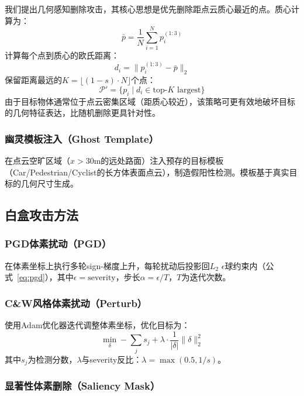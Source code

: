 ﻿\documentclass[12pt,a4paper]{ctexart}
\begin{document}
我们提出几何感知删除攻击，其核心思想是优先删除距点云质心最近的点。质心计算为：
\begin{equation}
  \bar{p} = \frac{1}{N}\sum_{i=1}^{N} p_i^{(1:3)}
  \label{eq:centroid}
\end{equation}
计算每个点到质心的欧氏距离：
\begin{equation}
  d_i = \|p_i^{(1:3)} - \bar{p}\|_2
  \label{eq:dist}
\end{equation}
保留距离最远的$K = \lfloor(1-s)\cdot N\rfloor$个点：
\begin{equation}
  \mathcal{P}' = \{p_i \mid d_i \in \text{top-}K \text{ largest}\}
  \label{eq:geodrop}
\end{equation}
由于目标物体通常位于点云密集区域（距质心较近），该策略可更有效地破坏目标的几何特征表达，比随机删除更具针对性。

\subsubsection{幽灵模板注入（Ghost Template）}

在点云空旷区域（$x > 30$m的远处路面）注入预存的目标模板（Car/Pedestrian/Cyclist的长方体表面点云），制造假阳性检测。模板基于真实目标的几何尺寸生成。

\subsection{白盒攻击方法}

\subsubsection{PGD体素扰动（PGD）}

在体素坐标上执行多轮sign-梯度上升，每轮扰动后投影回$L_2$ $\epsilon$球约束内（公式~\ref{eq:pgd}），其中$\epsilon = \text{severity}$，步长$\alpha = \epsilon / T$，$T$为迭代次数。

\subsubsection{C\&W风格体素扰动（Perturb）}

使用Adam优化器迭代调整体素坐标，优化目标为：
\begin{equation}
  \min_{\delta} -\sum_{j} s_j + \lambda \cdot \frac{1}{|\delta|}\|\delta\|_2^2
  \label{eq:perturb}
\end{equation}
其中$s_j$为检测分数，$\lambda$与severity反比：$\lambda = \max(0.5, 1/s)$。

\subsubsection{显著性体素删除（Saliency Mask）}
\end{document}
